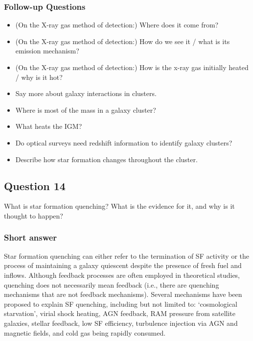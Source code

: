 \documentclass[a4paper,10pt]{article}
\begin{document}
\subsubsection{Follow-up Questions}

\begin{itemize}
    \item (On the X-ray gas method of detection:) Where does it come from?
    \item (On the X-ray gas method of detection:) How do we see it / what is its emission mechanism?
    \item (On the X-ray gas method of detection:) How is the x-ray gas initially heated / why is it hot?
    \item Say more about galaxy interactions in clusters.
    \item Where is most of the mass in a galaxy cluster?
    \item What heats the IGM?
    \item Do optical surveys need redshift information to identify galaxy clusters?
    \item Describe how star formation changes throughout the cluster.
    \end{itemize}




\newpage
\subsection{Question 14}

What is star formation quenching? What is the evidence for it, and why is it thought to happen?

\subsubsection{Short answer}

Star formation quenching can either refer to the termination of SF activity or the process of maintaining a galaxy quiescent despite the presence of fresh fuel and inflows. Although feedback processes are often employed in theoretical studies, quenching does not necessarily mean feedback (i.e., there are quenching mechanisms that are not feedback mechanisms). Several mechanisms have been proposed to explain SF quenching, including but not limited to: `cosmological starvation', virial shock heating, AGN feedback, RAM pressure from satellite galaxies, stellar feedback, low SF efficiency, turbulence injection via AGN and magnetic fields, and cold gas being rapidly consumed.
\end{document}
